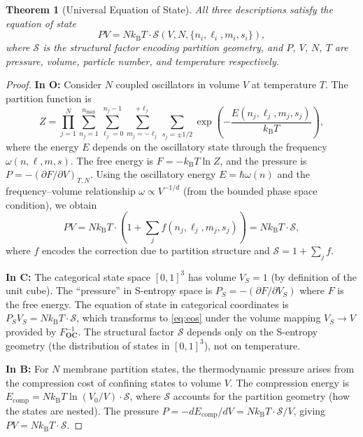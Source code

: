 \documentclass[twocolumn,10pt]{article}
\newtheorem{theorem}{Theorem}[section]
\theoremstyle{remark}
\newcommand{\kB}{k_{\mathrm{B}}}
\newcommand{\CatO}{\mathbf{O}}
\newcommand{\CatC}{\mathbf{C}}
\newcommand{\CatB}{\mathbf{B}}
\newcommand{\Foc}{F_{\CatO\CatC}}
\begin{document}
\begin{theorem}[Universal Equation of State]
\label{thm:eos}
All three descriptions satisfy the equation of state
\begin{equation}
PV = N\kB T \cdot \mathcal{S}(V, N, \{n_i, \ell_i, m_i, s_i\}),
\label{eq:eos}
\end{equation}
where $\mathcal{S}$ is the structural factor encoding partition geometry, and $P$, $V$, $N$, $T$ are pressure, volume, particle number, and temperature respectively.
\end{theorem}

\begin{proof}
\textbf{In $\CatO$:}
Consider $N$ coupled oscillators in volume $V$ at temperature $T$.
The partition function is
\begin{equation}
Z = \prod_{j=1}^{N}\sum_{n_j=1}^{n_{\max}}\sum_{\ell_j=0}^{n_j-1}\sum_{m_j=-\ell_j}^{+\ell_j}\sum_{s_j=\pm 1/2} \exp\!\left(-\frac{E(n_j,\ell_j,m_j,s_j)}{\kB T}\right),
\end{equation}
where the energy $E$ depends on the oscillatory state through the frequency $\omega(n,\ell,m,s)$.
The free energy is $F = -\kB T \ln Z$, and the pressure is $P = -(\partial F/\partial V)_{T,N}$.
Using the oscillatory energy $E = \hbar\omega(n)$ and the frequency--volume relationship $\omega \propto V^{-1/d}$ (from the bounded phase space condition), we obtain
\begin{equation}
PV = N\kB T \cdot \left(1 + \sum_j f(n_j,\ell_j,m_j,s_j)\right) = N\kB T \cdot \mathcal{S},
\end{equation}
where $f$ encodes the correction due to partition structure and $\mathcal{S} = 1 + \sum_j f$.

\textbf{In $\CatC$:}
The categorical state space $[0,1]^3$ has volume $V_S = 1$ (by definition of the unit cube).
The ``pressure'' in S-entropy space is $P_S = -(\partial F/\partial V_S)$ where $F$ is the free energy.
The equation of state in categorical coordinates is $P_S V_S = N\kB T \cdot \mathcal{S}$, which transforms to \eqref{eq:eos} under the volume mapping $V_S \to V$ provided by $\Foc^{-1}$.
The structural factor $\mathcal{S}$ depends only on the S-entropy geometry (the distribution of states in $[0,1]^3$), not on temperature.

\textbf{In $\CatB$:}
For $N$ membrane partition states, the thermodynamic pressure arises from the compression cost of confining states to volume $V$.
The compression energy is $E_{\mathrm{comp}} = N\kB T \ln(V_0/V) \cdot \mathcal{S}$, where $\mathcal{S}$ accounts for the partition geometry (how the states are nested).
The pressure $P = -dE_{\mathrm{comp}}/dV = N\kB T \cdot \mathcal{S}/V$, giving $PV = N\kB T \cdot \mathcal{S}$.
\end{proof}
\end{document}
